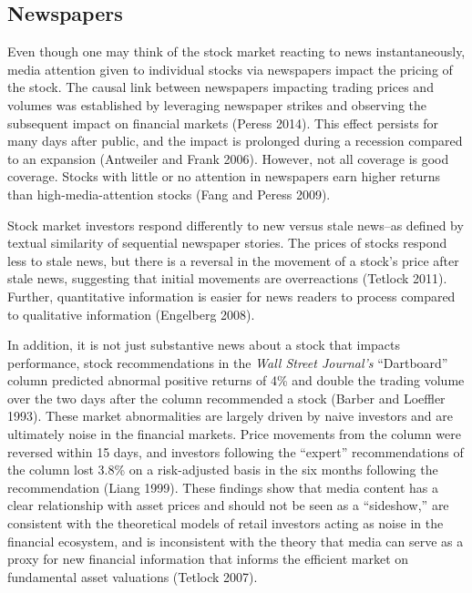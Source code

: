 \documentclass[12pt,]{article}
\begin{document}
\hypertarget{newspapers}{%
\subsection{Newspapers}\label{newspapers}}

Even though one may think of the stock market reacting to news
instantaneously, media attention given to individual stocks via
newspapers impact the pricing of the stock. The causal link between
newspapers impacting trading prices and volumes was established by
leveraging newspaper strikes and observing the subsequent impact on
financial markets (Peress 2014). This effect persists for many days
after public, and the impact is prolonged during a recession compared to
an expansion (Antweiler and Frank 2006). However, not all coverage is
good coverage. Stocks with little or no attention in newspapers earn
higher returns than high-media-attention stocks (Fang and Peress 2009).

Stock market investors respond differently to new versus stale news--as
defined by textual similarity of sequential newspaper stories. The
prices of stocks respond less to stale news, but there is a reversal in
the movement of a stock's price after stale news, suggesting that
initial movements are overreactions (Tetlock 2011). Further,
quantitative information is easier for news readers to process compared
to qualitative information (Engelberg 2008).

In addition, it is not just substantive news about a stock that impacts
performance, stock recommendations in the \emph{Wall Street Journal's}
``Dartboard'' column predicted abnormal positive returns of 4\% and
double the trading volume over the two days after the column recommended
a stock (Barber and Loeffler 1993). These market abnormalities are
largely driven by naive investors and are ultimately noise in the
financial markets. Price movements from the column were reversed within
15 days, and investors following the ``expert'' recommendations of the
column lost 3.8\% on a risk-adjusted basis in the six months following
the recommendation (Liang 1999). These findings show that media content
has a clear relationship with asset prices and should not be seen as a
``sideshow,'' are consistent with the theoretical models of retail
investors acting as noise in the financial ecosystem, and is
inconsistent with the theory that media can serve as a proxy for new
financial information that informs the efficient market on fundamental
asset valuations (Tetlock 2007).
\end{document}
